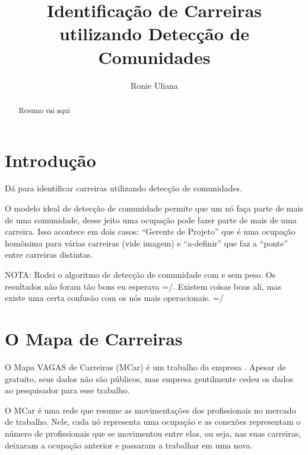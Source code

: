 \documentclass[
  article,
  11pt,
  a4paper,
  english,
  brazil,
  sumario=tradicional]{abntex2}
\title{Identificação de Carreiras utilizando Detecção de Comunidades}
\author{Ronie Uliana}
\begin{document}

\frenchspacing

\maketitle

\begin{abstract}
Resumo vai aqui
\end{abstract}

\section{Introdução}

Dá para identificar carreiras utilizando detecção de comunidades.

O modelo ideal de detecção de comunidade permite que um nó faça parte de mais de uma comunidade, desse jeito uma ocupação pode fazer parte de mais de uma carreira. Isso acontece em dois casos: \enquote{Gerente de Projeto} que é uma ocupação homônima para várias carreiras (vide imagem) e \enquote{a-definir} que faz a \enquote{ponte} entre carreiras distintas.

NOTA: Rodei o algoritmo de detecção de comunidade com e sem peso. Os resultados não foram tão bons eu esperava =/. Existem coisas boas ali, mas existe uma certa confusão com os nós mais operacionais. =/


\section{O Mapa de Carreiras}

O Mapa VAGAS de Carreiras (MCar) é um trabalho da empresa  . Apesar de gratuito, seus dados não são públicos, mas empresa gentilmente cedeu os dados ao pesquisador para esse trabalho.

O MCar é uma rede que resume as movimentações dos profissionais no mercado de trabalho. Nele, cada nó representa uma ocupação e as conexões representam o número de profissionais que se movimentou entre elas, ou seja, nas suas carreiras, deixaram a ocupação anterior e passaram a trabalhar em uma nova.
\end{document}
